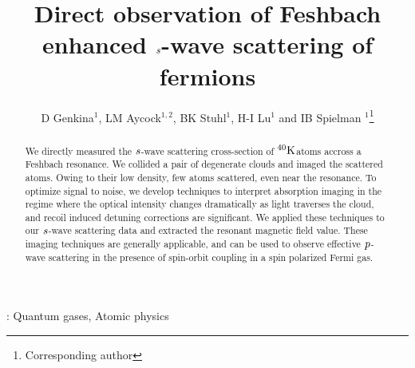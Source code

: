 \documentclass[12pt]{iopart}
\begin{document}
\newcommand{\swave}[0]{$\it{s}$-wave }
\newcommand{\pwave}[0]{$\it{p}$-wave }
\newcommand{\K}{ $^{40}\rm{K}$}
\newcommand{\Rb}{ $^{87}\rm{Rb}$}
\newcommand{\us}{$\mu \rm{s}$} 

\title[]{Direct observation of Feshbach enhanced \swave scattering of fermions}

\author{D Genkina$^1$, LM Aycock$^{1,2}$, BK Stuhl$^1$, H-I Lu$^1$ and IB Spielman
$^1$\footnote{Corresponding author}}

\address{$^1$Joint Quantum Institute, National Institute of Standards and Technology, and University of Maryland, Gaithersburg, MD, 20899 USA}
\address{$^2$Physics Department, Cornell University, Ithaca, NY 14850 USA}


\begin{abstract}
We directly measured the \swave{} scattering cross-section of \K atoms accross a Feshbach resonance. We collided a pair of degenerate clouds and imaged the scattered atoms. Owing to their low density, few atoms scattered, even near the resonance. To optimize signal to noise, we develop techniques to interpret absorption imaging in the regime where the optical intensity changes dramatically as light traverses the cloud, and recoil induced 
detuning corrections are significant. We applied these techniques to our \swave{} scattering data and extracted the resonant magnetic
field value. These imaging techniques are generally applicable, and can be used to observe effective \pwave{} scattering in the presence of spin-orbit coupling in a spin polarized  Fermi gas.

\end{abstract}

\vspace{2pc}
: Quantum gases, Atomic physics

\maketitle
\end{document}
